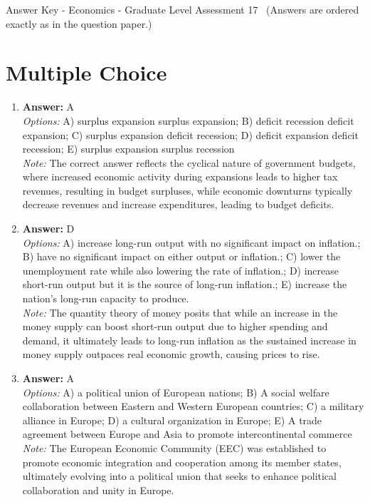 \documentclass[12pt]{article}
\begin{document}
\begin{center}
Answer Key - Economics - Graduate Level Assessment 17 \
\small (Answers are ordered exactly as in the question paper.)
\end{center}

\section*{Multiple Choice}
\begin{enumerate}[label=\arabic*.]
\item \textbf{Answer:} A
\\ \textit{Options:} A) surplus expansion surplus expansion; B) deficit recession deficit expansion; C) surplus expansion deficit recession; D) deficit expansion deficit recession; E) surplus expansion surplus recession
\\ \textit{Note:} The correct answer reflects the cyclical nature of government budgets, where increased economic activity during expansions leads to higher tax revenues, resulting in budget surpluses, while economic downturns typically decrease revenues and increase expenditures, leading to budget deficits.
\item \textbf{Answer:} D
\\ \textit{Options:} A) increase long-run output with no significant impact on inflation.; B) have no significant impact on either output or inflation.; C) lower the unemployment rate while also lowering the rate of inflation.; D) increase short-run output but it is the source of long-run inflation.; E) increase the nation's long-run capacity to produce.
\\ \textit{Note:} The quantity theory of money posits that while an increase in the money supply can boost short-run output due to higher spending and demand, it ultimately leads to long-run inflation as the sustained increase in money supply outpaces real economic growth, causing prices to rise.
\item \textbf{Answer:} A
\\ \textit{Options:} A) a political union of European nations; B) A social welfare collaboration between Eastern and Western European countries; C) a military alliance in Europe; D) a cultural organization in Europe; E) A trade agreement between Europe and Asia to promote intercontinental commerce
\\ \textit{Note:} The European Economic Community (EEC) was established to promote economic integration and cooperation among its member states, ultimately evolving into a political union that seeks to enhance political collaboration and unity in Europe.

\end{enumerate}
\end{document}
